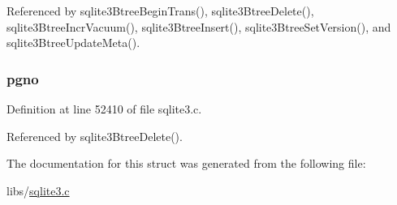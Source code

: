 Referenced by sqlite3\+Btree\+Begin\+Trans(), sqlite3\+Btree\+Delete(), sqlite3\+Btree\+Incr\+Vacuum(), sqlite3\+Btree\+Insert(), sqlite3\+Btree\+Set\+Version(), and sqlite3\+Btree\+Update\+Meta().

\hypertarget{struct_mem_page_a77cf3333a46c0b2e6d1614dce1a6405a}{}
\subsubsection[{pgno}]{ pgno}\label{struct_mem_page_a77cf3333a46c0b2e6d1614dce1a6405a}


Definition at line 52410 of file sqlite3.\+c.



Referenced by sqlite3\+Btree\+Delete().



The documentation for this struct was generated from the following file\+:\begin{DoxyCompactItemize}
\item 
libs/\hyperlink{sqlite3_8c}{sqlite3.\+c}\end{DoxyCompactItemize}
